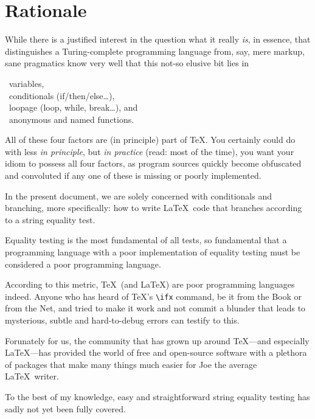 \documentclass[a5paper,10pt,german]{article}
\begin{document}
\null\newpage\thispagestyle{empty}\tableofcontents

\newpage
\section{Rationale}

While there is a justified interest in the question what it really {\em is}, in essence, that distinguishes a
Turing-complete programming language from, say, mere markup, sane pragmatics know very well that this
not-so elusive bit lies in

\RIGHTarrow~variables,\\
\RIGHTarrow~conditionals (if/then/else\ldots),\\
\RIGHTarrow~loopage (loop, while, break\ldots), and\\
\RIGHTarrow~anonymous and named functions.

All of these four factors are (in principle) part of \TeX. You certainly could do with less {\em in
principle}, but {\em in practice} (read: most of the time), you want your idiom to possess all four factors,
as program sources quickly become obfuscated and convoluted if any one of these is missing or poorly
implemented.

In the present document, we are solely concerned with conditionals and branching, more specifically: how
to write \LaTeX\ code that branches according to a string equality test.

Equality testing is the most fundamental of all tests, so fundamental that a programming language with a
poor implementation of equality testing must be considered a poor programming language.

According to this metric, \TeX\ (and \LaTeX) are poor programming languages indeed. Anyone who has heard
of \TeX's \verb#\ifx# command, be it from the Book or from the Net, and tried to make it work and not
commit a blunder that leads to mysterious, subtle and hard-to-debug errors can testify to this.

Forunately for us, the community that has grown up around \TeX—and especially \LaTeX—has provided the world
of free and open-source software with a plethora of packages that make many things much easier for Joe
the average \LaTeX\ writer.

To the best of my knowledge, easy and straightforward string equality testing has sadly not yet been fully
covered.
\end{document}
